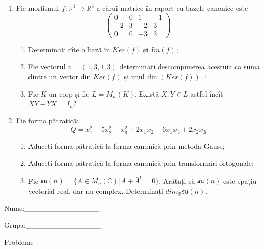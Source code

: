 \documentclass{article}
\begin{document}
\begin{enumerate}
 \item Fie morfismul $f:\mathbb{R}^4 \to \mathbb{R}^3$ a cărui matrice în raport cu bazele canonice este
$$\begin{pmatrix}
0&0&1&-1\\
-2&3&-2&3\\
0&0&-3&3
\end{pmatrix}$$

\begin{enumerate}
\item Determinați cîte o bază în $Ker(f)$ și $Im(f)$;
\item Fie vectorul $v=(1,3,1,3)$ determinați descompunerea acestuia ca suma dintre un vector din $Ker(f)$ și unul din $(Ker(f))^\perp$;
\item Fie $K$ un corp și fie $L=M_n(K)$. Există $X,Y \in L$ astfel încît $XY-YX=I_n$?  
\end{enumerate}
\item Fie forma pătratică:
$$Q= x_1^2+5x_2^2+x_3^2+2x_1x_2+6x_1x_3+2x_2x_3$$

\begin{enumerate}
\item Aduceți forma pătratică la forma canonică prin metoda Gauss;
\item Aduceți forma pătratică la forma canonică prin transformări ortogonale;
\item Fie $\mathfrak{su}(n)=\{ A \in M_n(\mathbb{C}) | A+\bar{A}^t=0\}$. Arătați că $\mathfrak{su}(n)$ este spațiu vectorial real, dar nu complex.
Determinați $dim_{\mathbb{R}}\mathfrak{su}(n)$.
\end{enumerate}
\end{enumerate}
\newpage
\begin{flushright}
Nume:\_\_\_\_\_\_\_\_\_\_\_\_\_\_
 
 
Grupa:\_\_\_\_\_\_\_\_\_\_\_\_\_\_
\end{flushright}
\begin{center}
\vspace{2cm}
{\Large Probleme}
\vspace{2cm}
\end{center}
\end{document}
